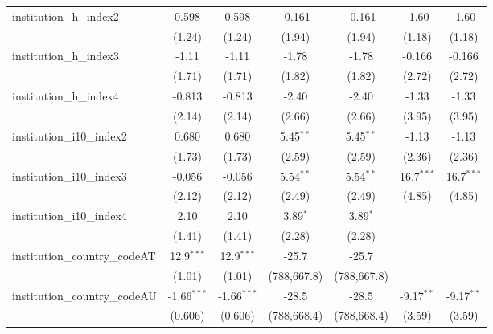 \begin{tabular}{lcccccc}
   institution\_h\_index2                & 0.598         & 0.598         & -0.161      & -0.161      & -1.60         & -1.60\\   
                                         & (1.24)        & (1.24)        & (1.94)      & (1.94)      & (1.18)        & (1.18)\\   
   institution\_h\_index3                & -1.11         & -1.11         & -1.78       & -1.78       & -0.166        & -0.166\\   
                                         & (1.71)        & (1.71)        & (1.82)      & (1.82)      & (2.72)        & (2.72)\\   
   institution\_h\_index4                & -0.813        & -0.813        & -2.40       & -2.40       & -1.33         & -1.33\\   
                                         & (2.14)        & (2.14)        & (2.66)      & (2.66)      & (3.95)        & (3.95)\\   
   institution\_i10\_index2              & 0.680         & 0.680         & 5.45$^{**}$ & 5.45$^{**}$ & -1.13         & -1.13\\   
                                         & (1.73)        & (1.73)        & (2.59)      & (2.59)      & (2.36)        & (2.36)\\   
   institution\_i10\_index3              & -0.056        & -0.056        & 5.54$^{**}$ & 5.54$^{**}$ & 16.7$^{***}$  & 16.7$^{***}$\\   
                                         & (2.12)        & (2.12)        & (2.49)      & (2.49)      & (4.85)        & (4.85)\\   
   institution\_i10\_index4              & 2.10          & 2.10          & 3.89$^{*}$  & 3.89$^{*}$  &               &   \\   
                                         & (1.41)        & (1.41)        & (2.28)      & (2.28)      &               &   \\   
   institution\_country\_codeAT          & 12.9$^{***}$  & 12.9$^{***}$  & -25.7       & -25.7       &               &   \\   
                                         & (1.01)        & (1.01)        & (788,667.8) & (788,667.8) &               &   \\   
   institution\_country\_codeAU          & -1.66$^{***}$ & -1.66$^{***}$ & -28.5       & -28.5       & -9.17$^{**}$  & -9.17$^{**}$\\   
                                         & (0.606)       & (0.606)       & (788,668.4) & (788,668.4) & (3.59)        & (3.59)\\   

\end{tabular}
